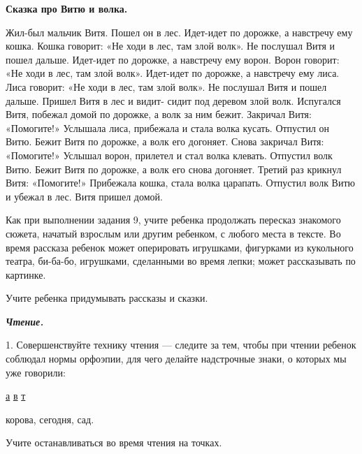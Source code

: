 \documentclass{book}
\renewcommand{\emph}[1]{\textit{#1}}
\begin{document}
\textbf{Сказка про Витю и волка.}

Жил-был мальчик Витя. Пошел он в лес. Идет-идет по дорожке, а навстречу
ему кошка. Кошка говорит: «Не ходи в лес, там злой волк». Не послушал
Витя и пошел дальше. Идет-идет по дорожке, а навстречу ему ворон. Ворон
говорит: «Не ходи в лес, там злой волк». Идет-идет по дорожке, а
навстречу ему лиса. Лиса говорит: «Не ходи в лес, там злой волк». Не
послушал Витя и пошел дальше. Пришел Витя в лес и видит- сидит под
деревом злой волк. Испугался Витя, побежал домой по дорожке, а волк за
ним бежит. Закричал Витя: «Помогите!» Услышала лиса, прибежала и стала
волка кусать. Отпустил он Витю. Бежит Витя по дорожке, а волк его
догоняет. Снова закричал Витя: «Помогите!» Услышал ворон, прилетел и
стал волка клевать. Отпустил волк Витю. Бежит Витя по дорожке, а волк
его снова догоняет. Третий раз крикнул Витя: «Помогите!» Прибежала
кошка, стала волка царапать. Отпустил волк Витю и убежал в лес. Витя
пришел домой.

Как при выполнении задания 9, учите ребенка продолжать пересказ
знакомого сюжета, начатый взрослым или другим ребенком, с любого места в
тексте. Во время рассказа ребенок может оперировать игрушками, фигурками
из кукольного театра, би-ба-бо, игрушками, сделанными во время лепки;
может рассказывать по картинке.

Учите ребенка придумывать рассказы и сказки.

\emph{\textbf{Чтение.}}

1. Совершенствуйте технику чтения --- следите за тем, чтобы при чтении
ребенок соблюдал нормы орфоэпии, для чего делайте надстрочные знаки, о
которых мы уже говорили:

\uline{а} \uline{в} \uline{т}

корова, сегодня, сад.

Учите останавливаться во время чтения на точках.
\end{document}
